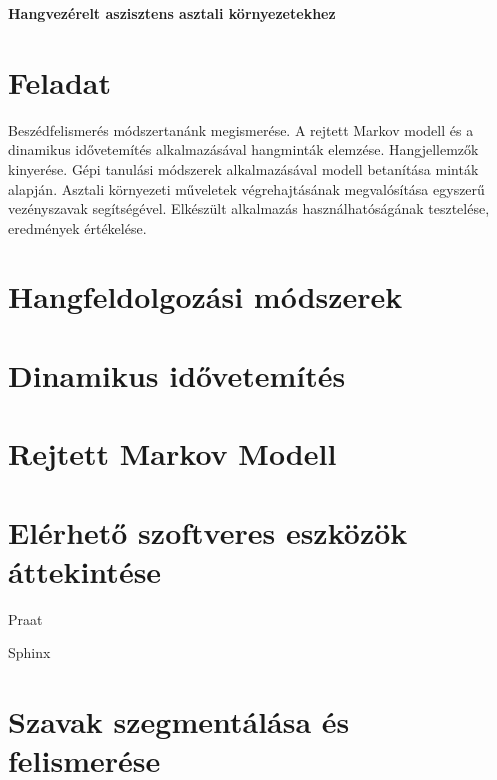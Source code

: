 \documentclass[a4paper]{paper}
\begin{document}
\begin{center}
   \large \textbf{Hangvezérelt aszisztens asztali környezetekhez}
\end{center}

\vskip 1cm

\section{Feladat}

Beszédfelismerés módszertanánk megismerése. A rejtett Markov modell és a dinamikus idővetemítés alkalmazásával hangminták elemzése. Hangjellemzők kinyerése. Gépi tanulási módszerek alkalmazásával modell betanítása minták alapján. Asztali környezeti műveletek végrehajtásának megvalósítása egyszerű vezényszavak segítségével. Elkészült alkalmazás használhatóságának tesztelése, eredmények értékelése.

\section{Hangfeldolgozási módszerek}


\section{Dinamikus idővetemítés}

\section{Rejtett Markov Modell}

\section{Elérhető szoftveres eszközök áttekintése}

Praat

Sphinx

\section{Szavak szegmentálása és felismerése}
\end{document}
